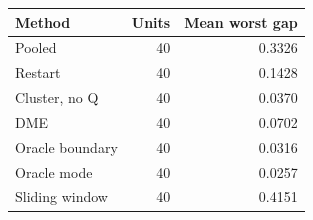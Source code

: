 \begin{tabular}{lrr}
\toprule
Method & Units & Mean worst gap \\
\midrule
Pooled & 40 & 0.3326 \\
Restart & 40 & 0.1428 \\
Cluster, no Q & 40 & 0.0370 \\
DME & 40 & 0.0702 \\
Oracle boundary & 40 & 0.0316 \\
Oracle mode & 40 & 0.0257 \\
Sliding window & 40 & 0.4151 \\
\bottomrule
\end{tabular}
